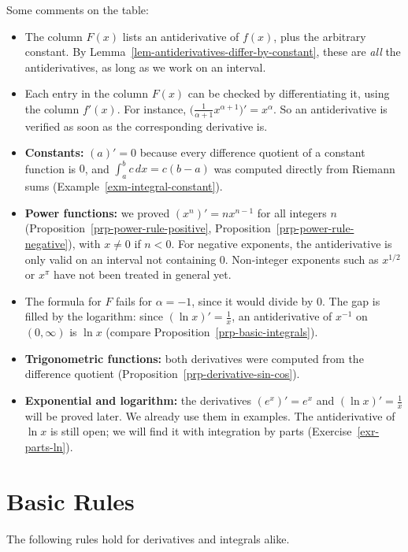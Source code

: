\documentclass[
  letterpaper,
  DIV=11,
  numbers=noendperiod]{scrreprt}
\providecommand{\tightlist}{%
  \setlength{\itemsep}{0pt}\setlength{\parskip}{0pt}}
\theoremstyle{plain}
\theoremstyle{plain}
\theoremstyle{definition}
\theoremstyle{definition}
\theoremstyle{definition}
\theoremstyle{plain}
\theoremstyle{plain}
\theoremstyle{remark}
\begin{document}
Some comments on the table:

\begin{itemize}
\tightlist
\item
  The column \(F(x)\) lists an antiderivative of \(f(x)\), plus the
  arbitrary constant. By
  Lemma~\ref{lem-antiderivatives-differ-by-constant}, these are
  \emph{all} the antiderivatives, as long as we work on an interval.
\item
  Each entry in the column \(F(x)\) can be checked by differentiating
  it, using the column \(f'(x)\). For instance,
  \(\big(\tfrac{1}{\alpha+1}x^{\alpha+1}\big)' = x^\alpha\). So an
  antiderivative is verified as soon as the corresponding derivative is.
\item
  \textbf{Constants:} \((a)'=0\) because every difference quotient of a
  constant function is \(0\), and \(\int_a^b c\,dx = c(b-a)\) was
  computed directly from Riemann sums
  (Example~\ref{exm-integral-constant}).
\item
  \textbf{Power functions:} we proved \((x^n)' = n x^{n-1}\) for all
  integers \(n\) (Proposition~\ref{prp-power-rule-positive},
  Proposition~\ref{prp-power-rule-negative}), with \(x\neq0\) if
  \(n<0\). For negative exponents, the antiderivative is only valid on
  an interval not containing \(0\). Non-integer exponents such as
  \(x^{1/2}\) or \(x^\pi\) have not been treated in general yet.
\item
  The formula for \(F\) fails for \(\alpha=-1\), since it would divide
  by \(0\). The gap is filled by the logarithm: since
  \((\ln x)' = \frac1x\), an antiderivative of \(x^{-1}\) on
  \((0,\infty)\) is \(\ln x\) (compare
  Proposition~\ref{prp-basic-integrals}).
\item
  \textbf{Trigonometric functions:} both derivatives were computed from
  the difference quotient (Proposition~\ref{prp-derivative-sin-cos}).
\item
  \textbf{Exponential and logarithm:} the derivatives \((e^x)'=e^x\) and
  \((\ln x)'=\frac1x\) will be proved later. We already use them in
  examples. The antiderivative of \(\ln x\) is still open; we will find
  it with integration by parts (Exercise~\ref{exr-parts-ln}).
\end{itemize}

\section{Basic Rules}\label{basic-rules}

The following rules hold for derivatives and integrals alike.
\end{document}
